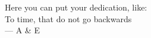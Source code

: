 \thispagestyle{empty}
{}

\vspace*{3cm}
\begin{center}
    Here you can put your dedication, like: \\ \medskip
    To time, that do not go backwards \\ \medskip
    --- A \& E 
\end{center}